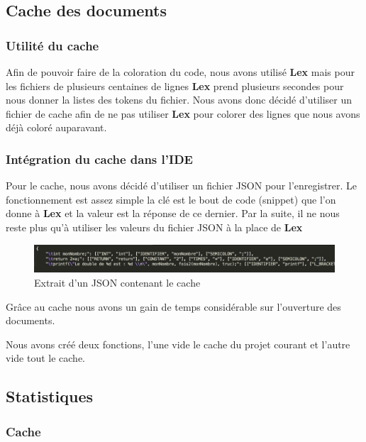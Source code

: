 \documentclass[a4paper,12pt]{article}
\begin{document}
	\subsection{Cache des documents}

		\subsubsection{Utilité du cache}

		Afin de pouvoir faire de la coloration du code, nous avons utilisé \textbf{Lex} mais pour les fichiers de plusieurs centaines de lignes \textbf{Lex} prend plusieurs secondes pour nous donner la listes des tokens du fichier. Nous avons donc décidé d'utiliser un fichier de cache afin de ne pas utiliser \textbf{Lex} pour colorer des lignes que nous avons déjà coloré auparavant.

		\subsubsection{Intégration du cache dans l'IDE}

		Pour le cache, nous avons décidé d'utiliser un fichier JSON pour l'enregistrer. Le fonctionnement est assez simple la clé est le bout de code (snippet) que l'on donne à \textbf{Lex} et la valeur est la réponse de ce dernier. Par la suite, il ne nous reste plus qu'à utiliser les valeurs du fichier JSON à la place de \textbf{Lex}

			\begin{figure}[h!]
				\begin{center}
					\includegraphics[scale=0.5]{images/exempleJsonCache}
					\caption{Extrait d'un JSON contenant le cache}
				\end{center}
			\end{figure}

		Grâce au cache nous avons un gain de temps considérable sur l'ouverture des documents.
		
		Nous avons créé deux fonctions, l'une vide le cache du projet courant et l'autre vide tout le cache. 
		
	\subsection{Statistiques}
	
		\subsubsection{Cache}
		
\end{document}
